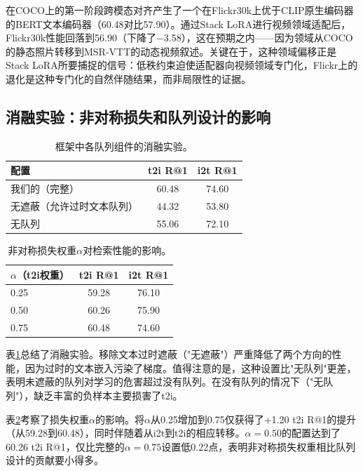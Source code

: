 \documentclass[10pt,a4paper]{ctexart}
\begin{document}
在COCO上的第一阶段跨模态对齐产生了一个在Flickr30k上优于CLIP原生编码器的BERT文本编码器（60.48对比57.90）。通过Stack LoRA进行视频领域适配后，Flickr30k性能回落到56.90（下降了$-$3.58），这在预期之内——因为领域从COCO的静态照片转移到MSR-VTT的动态视频叙述。关键在于，这种领域偏移正是Stack LoRA所要捕捉的信号：低秩约束迫使适配器向视频领域专门化，Flickr上的退化是这种专门化的自然伴随结果，而非局限性的证据。

\subsection{消融实验：非对称损失和队列设计的影响}

\begin{table}[htbp]
\centering
\begin{tabular}{lcc}
\toprule
配置 & t2i R@1 & i2t R@1 \\
\midrule
我们的（完整） & 60.48 & 74.60 \\
无遮蔽（允许过时文本队列） & 44.32 & 53.80 \\
无队列 & 55.06 & 72.10 \\
\bottomrule
\end{tabular}
\caption{框架中各队列组件的消融实验。}
\label{tab:ablation}
\end{table}

\begin{table}[htbp]
\centering
\begin{tabular}{lcc}
\toprule
$\alpha$（t2i权重） & t2i R@1 & i2t R@1 \\
\midrule
0.25 & 59.28 & 76.10 \\
0.50 & 60.26 & 75.90 \\
0.75 & 60.48 & 74.60 \\
\bottomrule
\end{tabular}
\caption{非对称损失权重$\alpha$对检索性能的影响。}
\label{tab:alpha}
\end{table}

表\ref{tab:ablation}总结了消融实验。移除文本过时遮蔽（"无遮蔽"）严重降低了两个方向的性能，因为过时的文本嵌入污染了梯度。值得注意的是，这种设置比"无队列"更差，表明未遮蔽的队列对学习的危害超过没有队列。在没有队列的情况下（"无队列"），缺乏丰富的负样本主要损害了t2i。

表\ref{tab:alpha}考察了损失权重$\alpha$的影响。将$\alpha$从0.25增加到0.75仅获得了+1.20 t2i R@1的提升（从59.28到60.48），同时伴随着从i2t到t2i的相应转移。$\alpha{=}0.50$的配置达到了60.26 t2i R@1，仅比完整的$\alpha{=}0.75$设置低0.22点，表明非对称损失权重相比队列设计的贡献要小得多。
\end{document}

